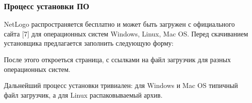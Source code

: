 \documentclass[14pt,a4paper,report]{report}
\begin{document}
\subsubsection{Процесс установки ПО}

NetLogo распространяется бесплатно и может быть загружен с официального сайта [7] для операционных систем Windows, Linux, Mac OS. Перед скачиванием установщика предлагается заполнить следующую форму:

 После этого откроеться страница, с ссылками на файл загрузчик для разных операционных систем.



\begin{figure}[h]
\begin{minipage}[h]{0.49\linewidth}
\end{minipage}
\hfill
\begin{minipage}[h]{0.49\linewidth}
\end{minipage}

\label{ris:image1}
\end{figure}




Дальнейший процесс установки тривиален: для Windows и Mac OS типичный файл загрузчик, а для Linux распаковываемый архив.
\end{document}
